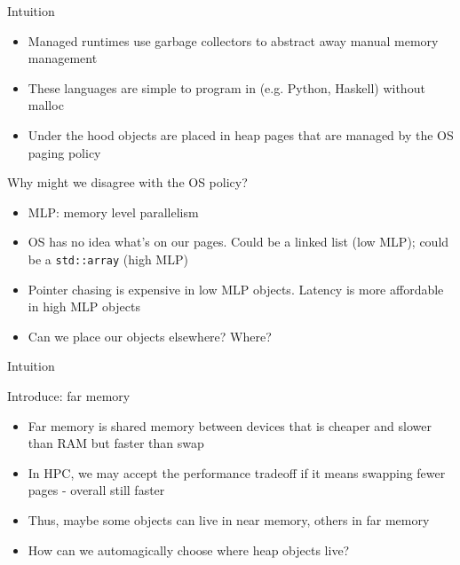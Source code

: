 \begin{frame}{Intuition}
  \begin{itemize}[<+>]
    \item Managed runtimes use garbage collectors to abstract away manual memory management
    \item These languages are simple to program in (e.g. Python, Haskell) without malloc
    \item Under the hood objects are placed in heap pages that are managed by the OS paging policy
  \end{itemize}

  \begin{block}{Why might we disagree with the OS policy?}
    \begin{itemize}[<+>]
      \item MLP: memory level parallelism
      \item OS has no idea what's on our pages. Could be a linked list (low MLP); could be a \texttt{std::array} (high MLP)
      \item Pointer chasing is expensive in low MLP objects. Latency is more affordable in high MLP objects
      \item Can we place our objects elsewhere? Where?
    \end{itemize}
  \end{block}
\end{frame}

\begin{frame}{Intuition}
  \begin{block}{Introduce: far memory}
    \begin{itemize}[<+>]
      \item Far memory is shared memory between devices that is cheaper and slower than RAM but faster than swap
      \item In HPC, we may accept the performance tradeoff if it means swapping fewer pages - overall still faster
      \item Thus, maybe some objects can live in near memory, others in far memory
      \item How can we automagically choose where heap objects live?
    \end{itemize}
  \end{block}
\end{frame}

